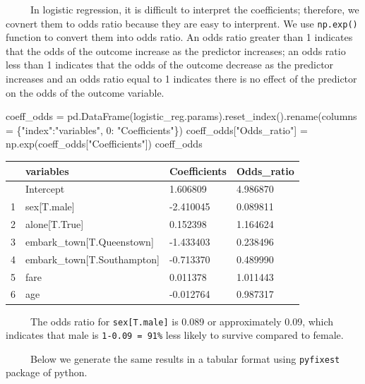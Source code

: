 \documentclass[
  letterpaper,
  DIV=11,
  numbers=noendperiod]{scrreprt}
\newenvironment{Shaded}{\begin{snugshade}}{\end{snugshade}}
\newcommand{\DecValTok}[1]{\textcolor[rgb]{0.68,0.00,0.00}{#1}}
\newcommand{\NormalTok}[1]{\textcolor[rgb]{0.00,0.23,0.31}{#1}}
\newcommand{\OperatorTok}[1]{\textcolor[rgb]{0.37,0.37,0.37}{#1}}
\newcommand{\StringTok}[1]{\textcolor[rgb]{0.13,0.47,0.30}{#1}}
\newcounter{none} %
\begin{document}
~~~~~In logistic regression, it is difficult to interpret the
coefficients; therefore, we covnert them to odds ratio because they are
easy to interprent. We use \texttt{np.exp()} function to convert them
into odds ratio. An odds ratio greater than 1 indicates that the odds of
the outcome increase as the predictor increases; an odds ratio less than
1 indicates that the odds of the outcome decrease as the predictor
increases and an odds ratio equal to 1 indicates there is no effect of
the predictor on the odds of the outcome variable.

\begin{Shaded}
\begin{Highlighting}[]
\NormalTok{coeff\_odds }\OperatorTok{=}\NormalTok{ pd.DataFrame(logistic\_reg.params).reset\_index().rename(columns }\OperatorTok{=}\NormalTok{ \{}\StringTok{"index"}\NormalTok{:}\StringTok{"variables"}\NormalTok{, }\DecValTok{0}\NormalTok{: }\StringTok{"Coefficients"}\NormalTok{\})}
\NormalTok{coeff\_odds[}\StringTok{"Odds\_ratio"}\NormalTok{] }\OperatorTok{=}\NormalTok{ np.exp(coeff\_odds[}\StringTok{"Coefficients"}\NormalTok{])}
\NormalTok{coeff\_odds}
\end{Highlighting}
\end{Shaded}

{\def\LTcaptype{none} %
\begin{longtable}[]{@{}llll@{}}
\toprule\noalign{}
& variables & Coefficients & Odds\_ratio \\
\midrule\noalign{}
\endhead
\bottomrule\noalign{}
\endlastfoot
0 & Intercept & 1.606809 & 4.986870 \\
1 & sex{[}T.male{]} & -2.410045 & 0.089811 \\
2 & alone{[}T.True{]} & 0.152398 & 1.164624 \\
3 & embark\_town{[}T.Queenstown{]} & -1.433403 & 0.238496 \\
4 & embark\_town{[}T.Southampton{]} & -0.713370 & 0.489990 \\
5 & fare & 0.011378 & 1.011443 \\
6 & age & -0.012764 & 0.987317 \\
\end{longtable}
}

~~~~~The odds ratio for \texttt{sex{[}T.male{]}} is 0.089 or
approximately 0.09, which indicates that male is
\texttt{1-0.09\ =\ 91\%} less likely to survive compared to female.

~~~~~Below we generate the same results in a tabular format using
\texttt{pyfixest} package of python.
\end{document}
